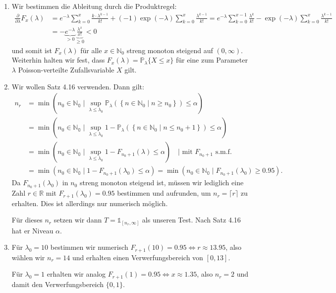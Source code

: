 \documentclass[a4paper]{article}
\begin{document}
\begin{enumerate}
    \item Wir bestimmen die Ableitung durch die Produktregel:
    \begin{align*}
        \frac{\partial}{\partial \lambda} F_x(\lambda) &= e^{- \lambda} \sum_{k = 0}^{x} \frac{k \cdot \lambda^{k-1}}{k!} + (-1) \exp(- \lambda) \sum_{k = 0}^{x} \frac{\lambda^{k-1}}{k!} = e^{- \lambda} \sum_{k = 0}^{x-1} \frac{\lambda^{k}}{k!} - \exp(- \lambda) \sum_{k = 0}^{x} \frac{\lambda^{k-1}}{k!}\\
        &= - \underbrace{e^{-\lambda}}_{> 0} \underbrace{\frac{\lambda^{x}}{x!}}_{\geq 0} < 0
    \end{align*}
    und somit ist $F_x(\lambda)$ für alle $x \in \mathds{N}_0$ streng monoton steigend auf $(0, \infty)$.
    Weiterhin halten wir fest, dass $F_x(\lambda) = \mathds{P}_\lambda\{ X \leq x \}$ für eine zum Parameter $\lambda$ Poisson-verteilte Zufallsvariable $X$ gilt.
    \item Wir wollen Satz 4.16 verwenden. Dann gilt:
    \begin{align*}
        n_r &= \min \left( n_0 \in \mathds{N_0} \mid \sup_{\lambda \leq \lambda_0} \mathds{P}_{\lambda}(\left\{n \in \mathds{N}_0 \mid n \geq n_0 \right\} ) \leq \alpha  \right) \\
        &=\min \left( n_0 \in \mathds{N_0} \mid \sup_{\lambda \leq \lambda_0} 1 - \mathds{P}_{\lambda}(\left\{n \in \mathds{N}_0 \mid n \leq n_0+1 \right\} ) \leq \alpha  \right) \\
        &=\min \left( n_0 \in \mathds{N_0} \mid \sup_{\lambda \leq \lambda_0} 1 - F_{n_0 + 1}(\lambda) \leq \alpha  \right) \quad \text{| mit } F_{n_0 + 1} \text{ s.m.f.}\\
        &=\min \left( n_0 \in \mathds{N_0} \mid 1 - F_{n_0 + 1}(\lambda_0) \leq \alpha  \right) =\min \left( n_0 \in \mathds{N_0} \mid F_{n_0 + 1}(\lambda_0) \geq 0.95  \right)\text{.}
    \end{align*}
    Da $F_{n_0 + 1}(\lambda_0)$ in $n_0$ streng monoton steigend ist, müssen wir lediglich eine Zahl $r \in \mathds{R}$ mit $F_{r + 1}(\lambda_0) = 0.95$ bestimmen und aufrunden, um $n_r = \lceil r \rceil$ zu erhalten.
    Dies ist allerdings nur numerisch möglich. 

    Für dieses $n_r$ setzen wir dann $T = \mathds{1}_{[n_r, \infty]}$ als unseren Test.
    Nach Satz 4.16 hat er Niveau $\alpha$.
    \item Für $\lambda_0 = 10$ bestimmen wir numerisch $F_{r + 1}(10) = 0.95 \iff r \approx 13.95$, also wählen wir $n_r = 14$ und erhalten einen Verwerfungsbereich von $[0, 13]$.
    
    Für $\lambda_0 = 1$ erhalten wir analog $F_{r+1}(1) = 0.95 \iff x \approx 1.35$, also $n_r = 2$ und damit den Verwerfungsbereich $\{0,1\}$.
\end{enumerate}

\subsection{}
\end{document}
